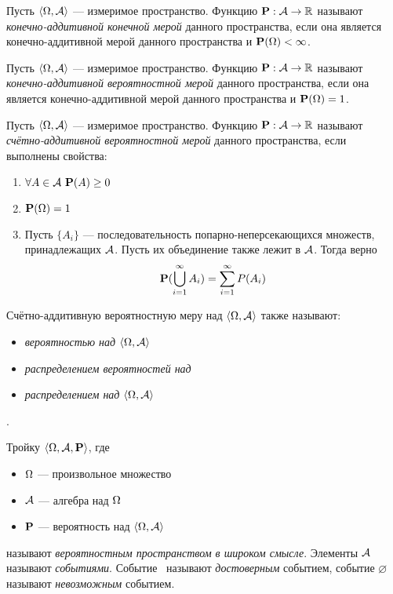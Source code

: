 \begin{definition}
	Пусть $\langle \Omega, \mathcal{A} \rangle$ --- измеримое пространство. Функцию $\mathbf{P} : \mathcal{A} \rightarrow \mathbb{R}$ называют {\it конечно-аддитивной конечной мерой} данного пространства, если она является конечно-аддитивной мерой данного пространства и $\mathbf{P} (\Omega) < \infty$.
\end{definition}

\begin{definition}
	Пусть $\langle \Omega, \mathcal{A} \rangle$ --- измеримое пространство. Функцию $\mathbf{P} : \mathcal{A} \rightarrow \mathbb{R}$ называют {\it конечно-аддитивной вероятностной мерой} данного пространства, если она является конечно-аддитивной мерой данного пространства и $\mathbf{P} (\Omega) = 1$.
\end{definition}

\begin{definition}
	Пусть $\langle \Omega, \mathcal{A} \rangle$ --- измеримое пространство. Функцию $\mathbf{P} : \mathcal{A} \rightarrow \mathbb{R}$ называют {\it счётно-аддитивной вероятностной мерой} данного пространства, если выполнены свойства:
	\begin{enumerate}
		\item $\forall A \in \mathcal{A} \ \mathbf{P}(A) \ge 0$
		\item $\mathbf{P} (\Omega) = 1$
		\item Пусть $\{A_i\}$ --- последовательность попарно-неперсекающихся множеств, принадлежащих $\mathcal{A}$. Пусть их объединение также лежит в $\mathcal{A}$. Тогда верно
		$$\mathbf{P} (\bigcup_{i=1}^{\infty}A_i) = \sum_{i=1}^{\infty}P(A_i)$$
	\end{enumerate}
Счётно-аддитивную вероятностную меру над $\langle \Omega, \mathcal{A} \rangle$ также называют:
\begin{itemize}
\item {\it вероятностью над $\langle \Omega, \mathcal{A} \rangle$}
\item {\it распределением вероятностей над \oO}
\item {\it распределением над $\langle \Omega, \mathcal{A} \rangle$}
\end{itemize}.
\end{definition}

\begin{definition}
	Тройку $\langle \Omega, \mathcal{A}, \mathbf{P} \rangle$, где
	\begin{itemize}
		\item $\Omega$ --- произвольное множество
		\item $\mathcal{A}$ --- алгебра над $\Omega$
		\item $\mathbf{P}$ --- вероятность над $\langle \Omega, \mathcal{A} \rangle$
	\end{itemize}
	называют {\it вероятностным пространством в широком смысле}. Элементы $\mathcal{A}$ называют {\it событиями}. Событие \oO~называют {\it достоверным} событием, событие $\varnothing$ называют {\it невозможным} событием.
\end{definition}

